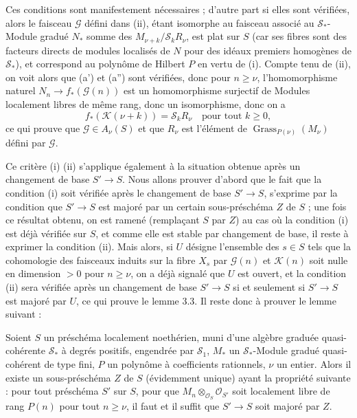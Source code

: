 Ces conditions sont manifestement nécessaires ; d'autre part si elles sont
vérifiées, alors le faisceau $\mathcal G$ défini dans (ii), étant isomorphe au
faisceau associé au $\mathcal S_*$-Module gradué $N_*$ somme des
$M_{\nu+k}/\mathcal S_kR_\nu$, est plat sur $S$ (car ses fibres sont des
facteurs directs de modules localisés de $N$ pour des idéaux premiers homogènes
de $\mathcal S_*$), et correspond au polynôme de Hilbert $P$ en vertu de (i).
Compte tenu de (ii), on voit alors que (a') et (a'') sont vérifiées, donc pour
$n\geq\nu$, l'homomorphisme naturel
$N_n\longrightarrow f_*(\mathcal G(n))$ est un homomorphisme surjectif de
Modules localement libres de même rang, donc un isomorphisme, donc on a
\[
f_*(\mathcal K(\nu+k))=\mathcal S_kR_\nu
\quad\text{pour tout $k\geq0$},
\]
ce qui prouve que $\mathcal G\in A_\nu(S)$ et que $R_\nu$ est l'élément de
$\operatorname{Grass}_{P(\nu)}(M_\nu)$ défini par $\mathcal G$.

Ce critère (i) (ii) s'applique également à la situation obtenue après un
changement de base $S'\longrightarrow S$. Nous allons prouver d'abord que le
fait que la condition (i) soit vérifiée après le changement de base
$S'\longrightarrow S$, s'exprime par la condition que $S'\longrightarrow S$
est majoré par un certain sous-préschéma $Z$ de $S$ ; une fois ce résultat
obtenu, on est ramené (remplaçant $S$ par $Z$) au cas où la condition (i) est
déjà vérifiée sur $S$, et comme elle est stable par changement de base, il
reste à exprimer la condition (ii). Mais alors, si $U$ désigne l'ensemble des
$s\in S$ tels que la cohomologie des faisceaux induits sur la fibre $X_s$ par
$\mathcal G(n)$ et $\mathcal K(n)$ soit nulle en dimension $>0$ pour
$n\geq\nu$, on a déjà signalé que $U$ est ouvert, et la condition (ii) sera
vérifiée après un changement de base $S'\longrightarrow S$ si et seulement si
$S'\longrightarrow S$ est majoré par $U$, ce qui prouve le lemme 3.3. Il reste
donc à prouver le lemme suivant :

 Soient $S$ un préschéma localement noethérien, muni d'une
algèbre graduée quasi-cohérente $\mathcal S_*$ à degrés positifs, engendrée par
$\mathcal S_1$, $M_*$ un $\mathcal S_*$-Module gradué quasi-cohérent de type
fini, $P$ un polynôme à coefficients rationnels, $\nu$ un entier. Alors il
existe un sous-préschéma $Z$ de $S$ (évidemment unique)
ayant la propriété suivante : pour tout préschéma $S'$ sur $S$, pour que
$M_n\otimes_{\mathcal O_S}\mathcal O_{S'}$ soit localement libre de rang $P(n)$
pour tout $n\geq\nu$, il faut et il suffit que $S'\longrightarrow S$ soit majoré
par $Z$.

